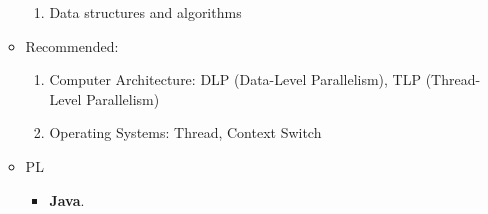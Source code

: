 \documentclass{article}
\begin{document}
\begin{enumerate}
\begin{itemize}
\begin{enumerate}
        \item Data structures and algorithms
    \end{enumerate}
        \item Recommended:
        \begin{enumerate}
            \item Computer Architecture: DLP (Data-Level Parallelism), TLP (Thread-Level Parallelism)
            \item Operating Systems: Thread, Context Switch
        \end{enumerate}
        \item PL
        \begin{itemize}
            \item \textbf{Java}.
        \end{itemize}
    \end{itemize}
\end{enumerate}
\end{document}
